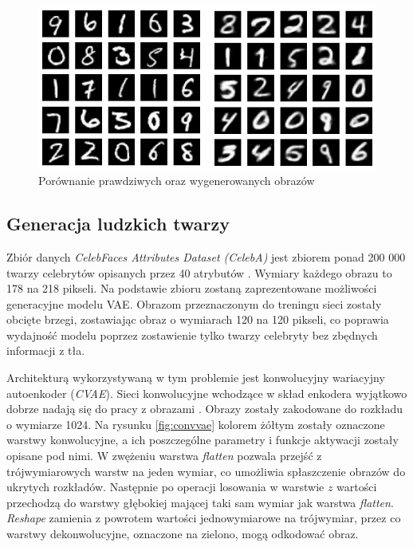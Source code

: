\documentclass[a4paper,12pt,oneside]{book} %
\begin{document}
\begin{figure}[h!]
	\centering
	\includegraphics[width=12cm]{vaegeneracja.png}
	\caption{Porównanie prawdziwych oraz wygenerowanych obrazów}
	\label{fig:vaegeneracja}
\end{figure}

\subsection{Generacja ludzkich twarzy}
Zbiór danych \textit{CelebFaces Attributes Dataset (CelebA)} jest zbiorem ponad 200 000 twarzy celebrytów opisanych przez 40 atrybutów \cite{celeba}. Wymiary każdego obrazu to 178 na 218 pikseli. Na podstawie zbioru zostaną zaprezentowane możliwości generacyjne modelu VAE. Obrazom przeznaczonym do treningu sieci zostały obcięte brzegi, zostawiając obraz o wymiarach 120 na 120 pikseli, co poprawia wydajność modelu poprzez zostawienie tylko twarzy celebryty bez zbędnych informacji z tła.

Architekturą wykorzystywaną w tym problemie jest konwolucyjny wariacyjny autoenkoder (\textit{CVAE}). Sieci konwolucyjne wchodzące w skład enkodera wyjątkowo dobrze nadają się do pracy z obrazami \cite{convvae}. Obrazy zostały zakodowane do rozkładu o wymiarze 1024. Na rysunku \ref{fig:convvae} kolorem żółtym zostały oznaczone warstwy konwolucyjne, a ich poszczególne parametry i funkcje aktywacji zostały opisane pod nimi. W zwężeniu warstwa \textit{flatten} pozwala przejść z trójwymiarowych warstw na jeden wymiar, co umożliwia spłaszczenie obrazów do ukrytych rozkładów. Następnie po operacji losowania w warstwie $z$ wartości przechodzą do warstwy głębokiej mającej taki sam wymiar jak warstwa \textit{flatten}. \textit{Reshape} zamienia z powrotem wartości jednowymiarowe na trójwymiar, przez co warstwy dekonwolucyjne, oznaczone na zielono, mogą odkodować obraz.
\end{document}
